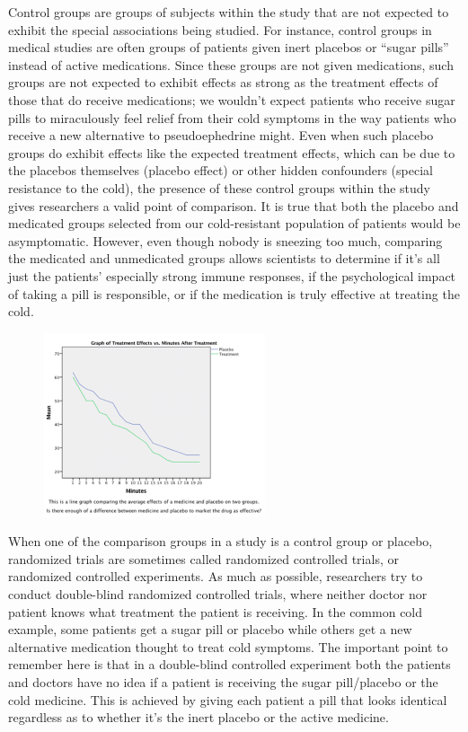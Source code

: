 \documentclass[11pt, chapterprefix=true]{scrbook}\usepackage[]{graphicx}\usepackage[]{color}
\begin{document}
Control groups are groups of subjects within the study that are not expected to exhibit the special associations being studied. For instance, control groups in medical studies are often groups of patients given inert placebos or “sugar pills” instead of active medications. Since these groups are not given medications, such groups are not expected to exhibit effects as strong as the treatment effects of those that do receive medications; we wouldn’t expect patients who receive sugar pills to miraculously feel relief from their cold symptoms in the way patients who receive a new alternative to pseudoephedrine might. Even when such placebo groups do exhibit effects like the expected treatment effects, which can be due to the placebos themselves (placebo effect) or other hidden confounders (special resistance to the cold), the presence of these control groups within the study gives researchers a valid point of comparison. It is true that both the placebo and medicated groups selected from our cold-resistant population of patients would be asymptomatic. However, even though nobody is sneezing too much, comparing the medicated and unmedicated groups allows scientists to determine if it’s all just the patients’ especially strong immune responses, if the psychological impact of taking a pill is responsible, or if the medication is truly effective at treating the cold.


\begin{figure}[ht]
   \centering
   \includegraphics[width=6.5cm]{chapters/Chapter_9/ext_figure/timeVsRx.png} %
\end{figure}

When one of the comparison groups in a study is a control group or placebo, randomized trials are sometimes called randomized controlled trials, or randomized controlled experiments. As much as possible, researchers try to conduct double-blind randomized controlled trials, where neither doctor nor patient knows what treatment the patient is receiving. In the common cold example, some patients get a sugar pill or placebo while others get a new alternative medication thought to treat cold symptoms.  The important point to remember here is that in a double-blind controlled experiment both the patients and doctors have no idea if a patient is receiving the sugar pill/placebo or the cold medicine. This is achieved by giving each patient a pill that looks identical regardless as to whether it’s the inert placebo or the active medicine.
\end{document}
